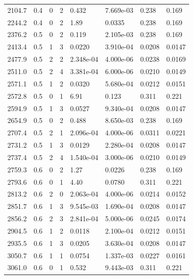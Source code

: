 \documentclass[preview]{standalone}
\begin{document}
{{{\begin{tabular}{L{1.2cm}C{1.2cm} C{0.3cm}C{0.5cm} C{1.4cm}C{1.4cm} C{1.4cm}C{1.4cm}}
  2104.7  &   0.4  & 0     &  2 &  0.432  & 7.669e-03  & 0.238 &  0.169   \\ 
  2244.2  &   0.4  & 0     &  2 &  1.89  & 0.0335  & 0.238 &  0.169   \\ 
  2376.2  &   0.5  & 0     &  2 &  0.119  & 2.105e-03  & 0.238 &  0.169   \\ 
  2413.4  &   0.5  & 1     &  3 &  0.0220  & 3.910e-04  & 0.0208 &  0.0147   \\ 
  2477.9  &   0.5  & 2     &  2 &  2.348e-04  & 4.000e-06  & 0.0238 &  0.0169   \\ 
  2511.0  &   0.5  & 2     &  4 &  3.381e-04  & 6.000e-06  & 0.0210 &  0.0149   \\ 
  2571.1  &   0.5  & 1     &  2 &  0.0320  & 5.680e-04  & 0.0212 &  0.0151   \\ 
  2572.8  &   0.5  & 0     &  1 &  6.91  & 0.123  & 0.311 &  0.221   \\ 
  2594.9  &   0.5  & 1     &  3 &  0.0527  & 9.340e-04  & 0.0208 &  0.0147   \\ 
  2654.9  &   0.5  & 0     &  2 &  0.488  & 8.650e-03  & 0.238 &  0.169   \\ 
  2707.4  &   0.5  & 2     &  1 &  2.096e-04  & 4.000e-06  & 0.0311 &  0.0221   \\ 
  2731.2  &   0.5  & 1     &  3 &  0.0129  & 2.280e-04  & 0.0208 &  0.0147   \\ 
  2737.4  &   0.5  & 2     &  4 &  1.540e-04  & 3.000e-06  & 0.0210 &  0.0149   \\ 
  2759.3  &   0.6  & 0     &  2 &  1.27  & 0.0226  & 0.238 &  0.169   \\ 
  2793.6  &   0.6  & 0     &  1 &  4.40  & 0.0780  & 0.311 &  0.221   \\ 
  2813.2  &   0.6  & 2     &  0 &  2.063e-04  & 4.000e-06  & 0.0214 &  0.0152   \\ 
  2851.7  &   0.6  & 1     &  3 &  9.545e-03  & 1.690e-04  & 0.0208 &  0.0147   \\ 
  2856.2  &   0.6  & 2     &  3 &  2.841e-04  & 5.000e-06  & 0.0245 &  0.0174   \\ 
  2904.5  &   0.6  & 1     &  2 &  0.0118  & 2.100e-04  & 0.0212 &  0.0151   \\ 
  2935.5  &   0.6  & 1     &  3 &  0.0205  & 3.630e-04  & 0.0208 &  0.0147   \\ 
  3050.7  &   0.6  & 1     &  1 &  0.0754  & 1.337e-03  & 0.0227 &  0.0161   \\ 
  3061.0  &   0.6  & 0     &  1 &  0.532  & 9.443e-03  & 0.311 &  0.221   \\ 

\end{tabular}}}}
\end{document}
